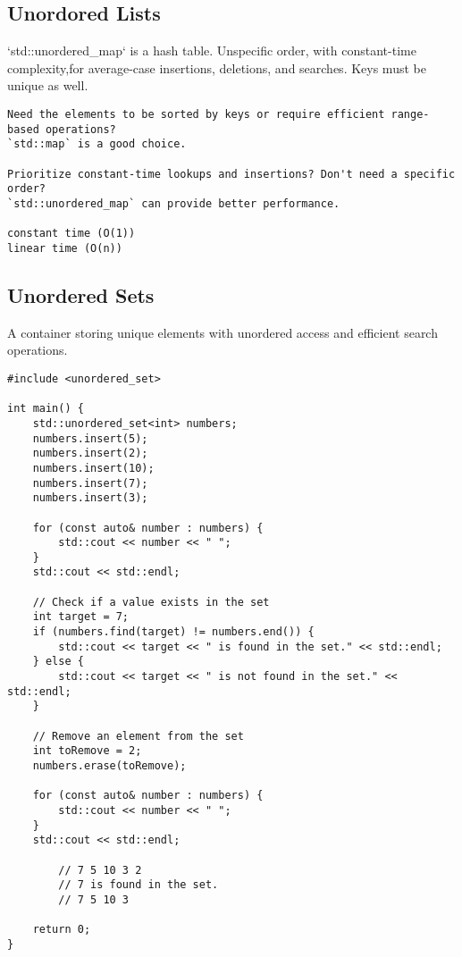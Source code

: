 \documentclass[openany]{report}
\begin{document}
\subsection{Unordored Lists}

`std::unordered\_map` is a hash table. 
Unspecific order, with constant-time complexity,for average-case 
insertions, deletions, and searches. 
Keys must be unique as well.

\begin{verbatim}
Need the elements to be sorted by keys or require efficient range-based operations?
`std::map` is a good choice.

Prioritize constant-time lookups and insertions? Don't need a specific order? 
`std::unordered_map` can provide better performance.

constant time (O(1)) 
linear time (O(n))
\end{verbatim}

\subsection{Unordered Sets}

A container storing unique elements with unordered access and efficient search operations.

\begin{verbatim}
#include <unordered_set>

int main() {
    std::unordered_set<int> numbers;
    numbers.insert(5);
    numbers.insert(2);
    numbers.insert(10);
    numbers.insert(7);
    numbers.insert(3);

    for (const auto& number : numbers) {
        std::cout << number << " ";
    }
    std::cout << std::endl;

    // Check if a value exists in the set
    int target = 7;
    if (numbers.find(target) != numbers.end()) {
        std::cout << target << " is found in the set." << std::endl;
    } else {
        std::cout << target << " is not found in the set." << std::endl;
    }

    // Remove an element from the set
    int toRemove = 2;
    numbers.erase(toRemove);

    for (const auto& number : numbers) {
        std::cout << number << " ";
    }
    std::cout << std::endl;

        // 7 5 10 3 2
        // 7 is found in the set.
        // 7 5 10 3

    return 0;
}
\end{verbatim}
\end{document}
